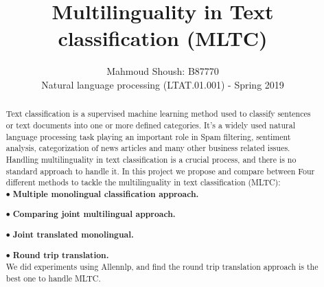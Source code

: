 \documentclass[letterpaper,12pt]{article}
\begin{document}
\title{Multilinguality in Text classification (MLTC)}

\author{Mahmoud Shoush: B87770\\ [1cm]{\small Natural language processing (LTAT.01.001) - Spring 2019}}

\date{\vspace{-5ex}}
\maketitle


\vspace{30 mm}
\begin{abstract}
Text classification is a supervised machine learning method used to classify sentences or text documents into one or more defined categories. It’s a widely used natural language processing task playing an important role in Spam filtering, sentiment analysis, categorization of news articles and many other business related issues. Handling multilinguality in text classification is a crucial process, and there is no standard approach to handle it. In this project we propose and compare between Four different methods to tackle the multilinguality in text classification (MLTC): \\

$\bullet$ \textbf{Multiple monolingual classification approach.}

$\bullet$ \textbf{Comparing joint multilingual approach.}

$\bullet$ \textbf{Joint translated monolingual.}

$\bullet$ \textbf{Round trip translation.}\\

We did experiments using Allennlp, and find the round trip translation approach is the best one to handle MLTC.


\end{abstract}
\end{document}
